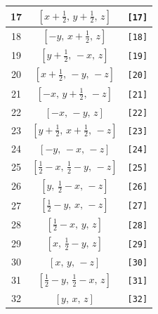 \documentclass[fleqn,8pt]{jsarticle}
\begin{document}
\begin{longtable}{ccc}
17 & $\left[ x + \frac{1}{2},\, y + \frac{1}{2},\, z \right]$ & {\tt [17]} \\ \hline
18 & $\left[ - y,\, x + \frac{1}{2},\, z \right]$ & {\tt [18]} \\ \hline
19 & $\left[ y + \frac{1}{2},\, - x,\, z \right]$ & {\tt [19]} \\ \hline
20 & $\left[ x + \frac{1}{2},\, - y,\, - z \right]$ & {\tt [20]} \\ \hline
21 & $\left[ - x,\, y + \frac{1}{2},\, - z \right]$ & {\tt [21]} \\ \hline
22 & $\left[ - x,\, - y,\, z \right]$ & {\tt [22]} \\ \hline
23 & $\left[ y + \frac{1}{2},\, x + \frac{1}{2},\, - z \right]$ & {\tt [23]} \\ \hline
24 & $\left[ - y,\, - x,\, - z \right]$ & {\tt [24]} \\ \hline
25 & $\left[ \frac{1}{2} - x,\, \frac{1}{2} - y,\, - z \right]$ & {\tt [25]} \\ \hline
26 & $\left[ y,\, \frac{1}{2} - x,\, - z \right]$ & {\tt [26]} \\ \hline
27 & $\left[ \frac{1}{2} - y,\, x,\, - z \right]$ & {\tt [27]} \\ \hline
28 & $\left[ \frac{1}{2} - x,\, y,\, z \right]$ & {\tt [28]} \\ \hline
29 & $\left[ x,\, \frac{1}{2} - y,\, z \right]$ & {\tt [29]} \\ \hline
30 & $\left[ x,\, y,\, - z \right]$ & {\tt [30]} \\ \hline
31 & $\left[ \frac{1}{2} - y,\, \frac{1}{2} - x,\, z \right]$ & {\tt [31]} \\ \hline
32 & $\left[ y,\, x,\, z \right]$ & {\tt [32]} \\
\end{longtable}
\end{document}
